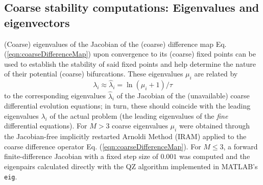 \documentclass[numbers]{frontiersSCNS}
\newcommand{\numCofs}{{M}}
\newcommand{\trueEig}{\lambda}
\newcommand{\coarseApproxdEig}{{\hat{\lambda}}}
\newcommand{\coarseEig}{{\mu}}
\newcommand{\eqnRef}[1]{Eq. (\ref{eqn:#1})}
\DeclareRobustCommand{\inTstep}{\tau}
\newcommand{\eigMethodThreshVal}{3}
\newcommand{\fdJacDiffVal}{0.001}
\begin{document}
\subsection{Coarse stability computations: Eigenvalues and eigenvectors}


(Coarse) eigenvalues of the Jacobian of the (coarse) difference map \eqnRef{coarseDifferenceMap}
upon convergence to its (coarse) fixed points
can be used to establish the stability of said fixed points and help
determine the nature of their potential (coarse) bifurcations.
%
These eigenvalues $\coarseEig_i$
%
are related by
\begin{equation}
\label{eqn:eigM2L}
\trueEig_i \approx {\coarseApproxdEig}_i = \ln(\coarseEig_i + 1) / {\inTstep}
\end{equation}
to the corresponding eigenvalues ${\coarseApproxdEig}_i$ of the Jacobian of the (unavailable)
coarse differential evolution equations; in turn, these should coincide with the
leading eigenvalues $\trueEig_i$ of the actual problem (the leading eigenvalues of
the  \emph{fine} differential equations).
%
For $\numCofs>\eigMethodThreshVal$ coarse eigenvalues $\mu_i$ were obtained through the Jacobian-free
implicitly restarted Arnoldi Method (IRAM)
\cite{Kelley1995,Lehoucq1998}
applied to the coarse difference operator \eqnRef{coarseDifferenceMap}.
%
For $\numCofs\le\eigMethodThreshVal$,
a forward finite-difference Jacobian with a fixed step size of $\fdJacDiffVal$
was computed and the eigenpairs calculated directly
with the QZ algorithm implemented in MATLAB's \texttt{eig}.
\end{document}
